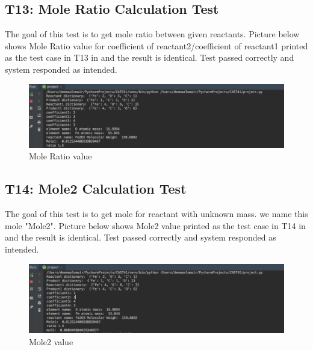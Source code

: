 \documentclass[12pt, titlepage]{article}
\begin{document}
\subsection{T13: Mole Ratio Calculation Test}

The goal of this test is to get mole ratio between given reactants. Picture below shows Mole Ratio value for coefficient of reactant2/coefficient of reactant1 printed  as the test case in T13 in \cite{UnitVnVPlan} and the result is identical. Test passed correctly and system responded as intended.

\begin{figure}[H]
 \begin{center}
 \includegraphics [width=\textwidth]{moleratio}
 \caption{\label{ Figure 20:} Mole Ratio value}
 \end{center}
 \end{figure}

\subsection{T14: Mole2 Calculation Test}

The goal of this test is to get mole for reactant with unknown mass. we name this mole "Mole2". Picture below shows Mole2 value printed as the test case in T14 in \cite{UnitVnVPlan} and the result is identical. Test passed correctly and system responded as intended.

\begin{figure}[H]
 \begin{center}
 \includegraphics [width=\textwidth]{mole2}
 \caption{\label{ Figure 21:} Mole2 value}
 \end{center}
 \end{figure}
 
\end{document}
